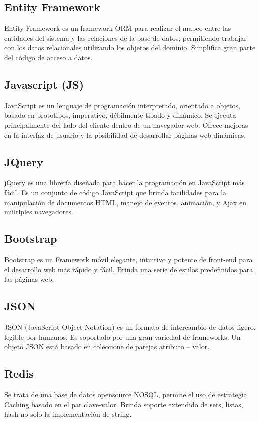 \documentclass[journal]{IEEEtran}
\begin{document}
\subsection{Entity Framework}
Entity Framework es un framework ORM para realizar el mapeo entre las entidades del sistema y las relaciones de la base de datos, permitiendo trabajar con los datos relacionales utilizando los objetos del dominio. Simplifica gran parte del código de acceso a datos.\cite{url:ef}

\subsection{Javascript (JS)}
JavaScript es un lenguaje de programación interpretado, orientado a objetos, basado en prototipos, imperativo, débilmente tipado y dinámico. Se ejecuta principalmente del lado del cliente dentro de un navegador web. Ofrece mejoras en la interfaz de usuario y la posibilidad de desarrollar páginas web dinámicas.\cite{url:javascript}

\subsection{JQuery}
jQuery es una librería diseñada para hacer la programación en JavaScript más fácil.
Es un conjunto de código JavaScript que brinda facilidades para la manipulación de documentos HTML, manejo de eventos, animación, y Ajax en múltiples navegadores.\cite{url:jquery}

\subsection{Bootstrap}
Bootstrap es un Framework móvil elegante, intuitivo y potente de front-end para el desarrollo web más rápido y fácil. Brinda una serie de estilos predefinidos para las páginas web.\cite{url:bootstrap}

\subsection{JSON}
JSON (JavaScript Object Notation) es un formato de intercambio de datos ligero, legible por humanos. Es soportado por una gran variedad de frameworks. Un objeto JSON está basado en coleccione de parejas atributo – valor.\cite{url:json} 
\subsection{Redis}             
Se trata de una base de datos opensource NOSQL, permite el uso de estrategia Caching basado en el par clave-valor. Brinda soporte extendido de sets, listas, hash no solo la implementación de string.\cite{url:redis}
\end{document}
